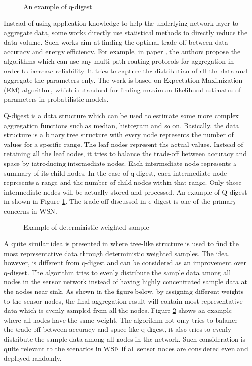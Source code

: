 \begin{figure}
\centering
{}
\caption{An example of q-digest}
\label{fig:qdigest}
\end{figure}

Instead of using application knowledge to help the underlying network layer to aggregate data, some works directly use statistical methods to directly reduce the data volume. Such works aim at finding the optimal trade-off between data accuracy and energy efficiency. For example, in paper \cite{jiang:statistical}, the authors propose the algorithms which can use any multi-path routing protocols for aggregation in order to increase reliability. It tries to capture the distribution of all the data and aggregate the parameters only. The work is based on Expectation-Maximization (EM) algorithm, which is standard for finding maximum likelihood estimates of parameters in probabilistic models.

Q-digest \cite{qdigest} is a data structure which can be used to estimate some more complex aggregation functions such as median, histogram and so on. Basically, the data structure is a binary tree structure with every node represents the number of values for a specific range. The leaf nodes represent the actual values. Instead of retaining all the leaf nodes, it tries to balance the trade-off between accuracy and space by introducing intermediate nodes. Each intermediate node represents a summary of its child nodes. In the case of q-digest, each intermediate node represents a range and the number of child nodes within that range. Only those intermediate nodes will be actually stored and processed. An example of Q-digest in shown in Figure \ref{fig:qdigest}. The trade-off discussed in q-digest is one of the primary concerns in WSN.

\begin{figure}
\centering
{}
\caption{Example of deterministic weighted sample}
\label{fig:deterministic}
\end{figure}

A quite similar idea is presented in \cite{akca:deterministic} where tree-like structure is used to find the most representative data through deterministic weighted samples. The idea, however, is different from q-digest and can be considered as an improvement over q-digest. The algorithm tries to evenly distribute the sample data among all nodes in the sensor network instead of having highly concentrated sample data at the nodes near sink. As shown in the figure below, by assigning different weights to the sensor nodes, the final aggregation result will contain most representative data which is evenly sampled from all the nodes. Figure \ref{fig:deterministic} shows an example where all nodes have the same weight. The algorithm not only tries to balance the trade-off between accuracy and space like q-digest, it also tries to evenly distribute the sample data among all nodes in the network. Such consideration is quite relevant to the scenarios in WSN if all sensor nodes are considered even and deployed randomly.

